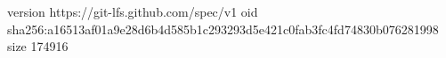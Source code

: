version https://git-lfs.github.com/spec/v1
oid sha256:a16513af01a9e28d6b4d585b1c293293d5e421c0fab3fc4fd74830b076281998
size 174916
